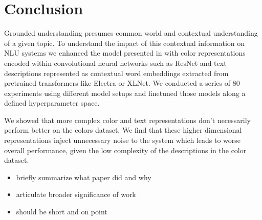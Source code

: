 \section{Conclusion}

Grounded understanding presumes common world and contextual understanding of a given topic. To understand the impact of this contextual information on NLU systems we enhanced the model presented in \citep{monroe-2017-colors} with color representations encoded within convolutional neural networks such as ResNet and text descriptions represented as contextual word embeddings extracted from pretrained transformers like Electra or XLNet. We conducted a series of 80 experiments using different model setups and finetuned those models along a defined hyperparameter space.

\par
We showed that more complex color and text representations don’t necessarily perform better on the colors dataset. We find that these higher dimensional representations inject unnecessary noise to the system which leads to worse overall performance, given the low complexity of the descriptions in the color dataset.

\begin{itemize}
  \item briefly summarize what paper did and why
  \item articulate broader significance of work
  \item should be short and on point
\end{itemize}